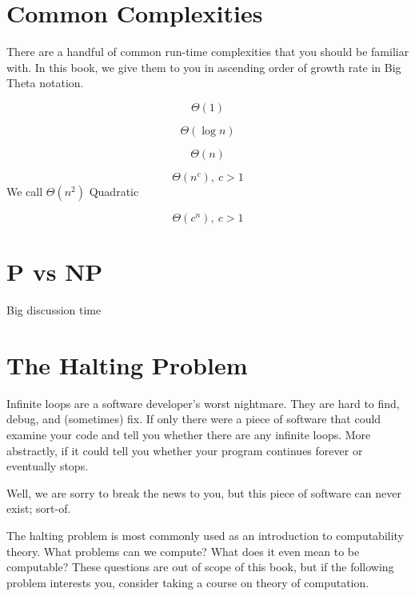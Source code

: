 \documentclass[main.tex]{subfiles}
\begin{document}

\section{Common Complexities}

There are a handful of common run-time complexities that you should be familiar with. In this book, we give them to you in ascending order of growth rate in Big Theta notation.

\begin{defn}[Constant]
	\[\Theta(1)\]
\end{defn}

\begin{defn}[Logarithmic]
	\[\Theta(\log n)\]
\end{defn}

\begin{defn}[Linear]
	\[\Theta(n)\]
\end{defn}

\begin{defn}[Polynomial]
	\[\Theta(n^c),\ c > 1\]
	We call \(\Theta(n^2)\) Quadratic
\end{defn}

\begin{defn}[Exponential]
	\[\Theta(c^n),\ c > 1\]
\end{defn}

\section{P vs NP}

Big discussion time %

\section{The Halting Problem}

Infinite loops are a software developer's worst nightmare. They are hard to find, debug, and (sometimes) fix. If only there were a piece of software that could examine your code and tell you whether there are any infinite loops. More abstractly, if it could tell you whether your program continues forever or eventually stops.

Well, we are sorry to break the news to you, but this piece of software can never exist; sort-of.

The halting problem is most commonly used as an introduction to computability theory. What problems can we compute? What does it even mean to be computable? These questions are out of scope of this book, but if the following problem interests you, consider taking a course on theory of computation.
\end{document}
